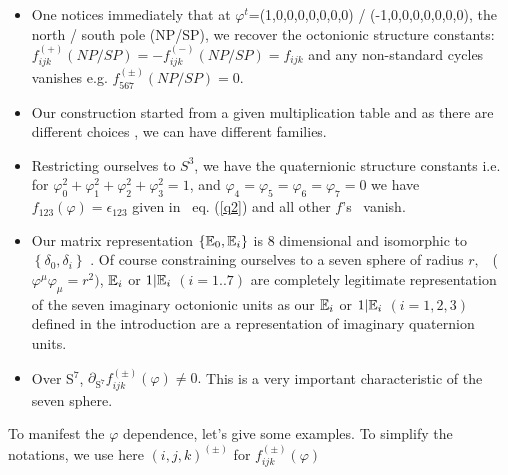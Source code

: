 \documentclass[a4paper,12pt]{book}
\begin{document}
\begin{itemize}
\item  One notices immediately that at $\varphi ^{t}$=(1,0,0,0,0,0,0,0) /
(-1,0,0,0,0,0,0,0), the north / south pole (NP/SP), we recover the
octonionic structure constants: $%
f_{ijk}^{(+)}(NP/SP)=-f_{ijk}^{(-)}(NP/SP)=f_{ijk}$ and any non-standard
cycles vanishes e.g. $f_{567}^{\left( \pm \right) }(NP/SP)=0$.

\item  Our construction started from a given multiplication table and as
there are different choices \cite{manog1}\cite{manog2}, we can have
different families.

\item  Restricting ourselves to $S^{3}$, we have the quaternionic structure
constants i.e. for $\varphi _{0}^{2}+\varphi _{1}^{2}+\varphi
_{2}^{2}+\varphi _{3}^{2}=1$, and $\varphi _{4}=\varphi _{5}=\varphi
_{6}=\varphi _{7}=0$ we have $f_{123}(\varphi )=\epsilon _{123}$ given in \
eq. (\ref{q2}) and all other $f$'s \ vanish.

\item  Our matrix representation $\left\{ \Bbb{E}_{0},\Bbb{E}_{i}\right\} $
is 8 dimensional and isomorphic to $\left\{ \delta _{0},\delta _{i}\right\} $%
. Of course constraining ourselves to a seven sphere of radius $r,$ \ ($%
\varphi ^{\mu }\varphi _{\mu }=r^{2})$, $\Bbb{E}_{i}$ or $1|\Bbb{E}_{i}$ $%
\left( i=1..7\right) $ are completely legitimate representation of the seven
imaginary octonionic units as our $\Bbb{E}_{i}$ or $1|\Bbb{E}_{i}$ $\left(
i=1,2,3\right) $ defined in the introduction are a representation of
imaginary quaternion units.

\item  Over S$^{7}$, $\partial _{\mbox{S}^{7}}f_{ijk}^{\left( \pm \right)
}(\varphi )\neq 0.$ This is a very important characteristic of the seven
sphere.
\end{itemize}

To manifest the $\varphi $ dependence, let's give some examples. To simplify
the notations, we use here $(i,j,k)^{\left( \pm \right) }$ for $%
f_{ijk}^{\left( \pm \right) }(\varphi )$
\end{document}
